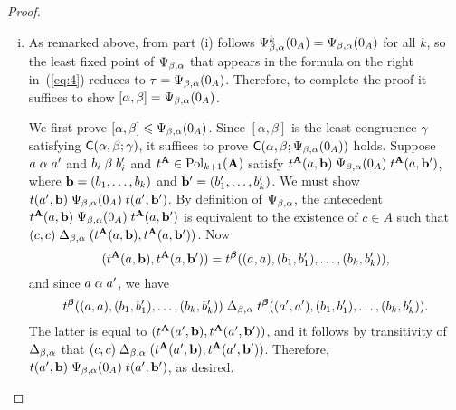 \begin{proof}
\begin{enumerate}[(i)]
  \medskip

\item
  As remarked above, from part (i) follows 
  $\Psi_{\beta, \alpha}^{k}(0_A) = \Psi_{\beta, \alpha}(0_A)$ for all $k$, so the least fixed point of
  $\Psi_{\beta, \alpha}$ that appears in the formula on the right in~(\ref{eq:4}) reduces
  to $\tau = \Psi_{\beta, \alpha}(0_A)$.  Therefore, to complete the proof it suffices to show
  $[\alpha, \beta] = \Psi_{\beta, \alpha}(0_A)$.


  We first prove $[\alpha, \beta]\leqslant \Psi_{\beta, \alpha}(0_A)$.
  Since $[\alpha, \beta]$ is the least congruence $\gamma$
  satisfying $\mathsf{C}(\alpha, \beta; \gamma)$, it suffices to prove
    $\mathsf{C}(\alpha, \beta; \Psi_{\beta, \alpha}(0_A))$ holds.
    Suppose $a \mathrel{\alpha} a'$ and $b_i \mathrel{\beta} b_i'$ %
    and $t^{\mathbf{A}} \in \operatorname{Pol}_{k+1}(\mathbf{A})$ satisfy
    $t^{\mathbf{A}}(a, \mathbf{b}) \mathrel{\Psi_{\beta, \alpha}(0_A)} t^{\mathbf{A}}(a, \mathbf{b}')$,
    where $\mathbf{b} = (b_1, \dots, b_k)$ and $\mathbf{b}' = (b_1', \dots, b_k')$.
    We must show $t(a', \mathbf{b}) \mathrel{\Psi_{\beta, \alpha}(0_A)} t(a', \mathbf{b}')$.  
    By definition of $\Psi_{\beta, \alpha}$,
    the antecedent $t^{\mathbf{A}}(a, \mathbf{b}) \mathrel{\Psi_{\beta, \alpha}(0_A)} t^{\mathbf{A}}(a, \mathbf{b}')$ is equivalent to    
    the existence of $c \in A$ such that $(c,c) \mathrel{\Delta_{\beta, \alpha}} (t^{\mathbf{A}}(a, \mathbf{b}), t^{\mathbf{A}}(a, \mathbf{b}'))$.
    Now
    \[
    (t^{\mathbf{A}}(a, \mathbf{b}), t^{\mathbf{A}}(a, \mathbf{b}')) = t^{\boldsymbol{\beta}}((a,a),(b_1, b_1'), \dots,(b_k, b_k')),
    \]
    and since $a \mathrel{\alpha} a'$, we have
    \[
    t^{\boldsymbol{\beta}}((a,a),(b_1, b_1'), \dots,(b_k, b_k'))
    \mathrel{\Delta_{\beta, \alpha}}
    t^{\boldsymbol{\beta}}((a',a'),(b_1, b_1'), \dots,(b_k, b_k')).
    \]
    The latter is equal to $(t^{\mathbf{A}}(a', \mathbf{b}), t^{\mathbf{A}}(a', \mathbf{b}'))$, and  it follows
    by transitivity of $\Delta_{\beta, \alpha}$ that
    $(c,c) \mathrel{\Delta_{\beta, \alpha}} (t^{\mathbf{A}}(a', \mathbf{b}), t^{\mathbf{A}}(a', \mathbf{b}'))$.
    Therefore, $t(a', \mathbf{b}) \mathrel{\Psi_{\beta, \alpha}(0_A)} t(a', \mathbf{b}')$, as desired.  




\end{enumerate}
\end{proof}
